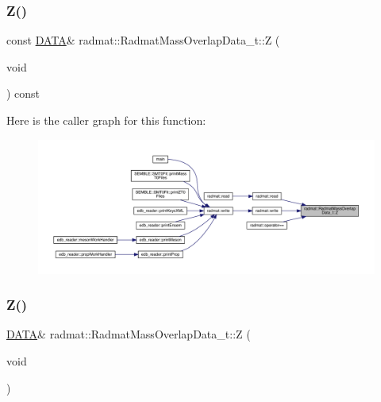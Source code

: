 \mbox{\label{structradmat_1_1RadmatMassOverlapData__t_a1453a8a3daa1adf8693514f0d5d9756b}} 
\subsubsection{\texorpdfstring{Z()}{Z()}\hspace{0.1cm}{\footnotesize\ttfamily [1/2]}}
{\footnotesize\ttfamily const \mbox{\hyperlink{structradmat_1_1RadmatMassOverlapData__t_ab3de1245b76e79f9867e3af00989e5b6}{D\+A\+TA}}\& radmat\+::\+Radmat\+Mass\+Overlap\+Data\+\_\+t\+::Z (\begin{DoxyParamCaption}\item[{void}]{ }\end{DoxyParamCaption}) const\hspace{0.3cm}{\ttfamily [inline]}}

Here is the caller graph for this function\+:
\nopagebreak
\begin{figure}[H]
\begin{center}
\leavevmode
\includegraphics[width=350pt]{d7/d75/structradmat_1_1RadmatMassOverlapData__t_a1453a8a3daa1adf8693514f0d5d9756b_icgraph}
\end{center}
\end{figure}
\mbox{\label{structradmat_1_1RadmatMassOverlapData__t_a120afeed8c628a5af25b392856939057}} 
\subsubsection{\texorpdfstring{Z()}{Z()}\hspace{0.1cm}{\footnotesize\ttfamily [2/2]}}
{\footnotesize\ttfamily \mbox{\hyperlink{structradmat_1_1RadmatMassOverlapData__t_ab3de1245b76e79f9867e3af00989e5b6}{D\+A\+TA}}\& radmat\+::\+Radmat\+Mass\+Overlap\+Data\+\_\+t\+::Z (\begin{DoxyParamCaption}\item[{void}]{ }\end{DoxyParamCaption})\hspace{0.3cm}{\ttfamily [inline]}}



